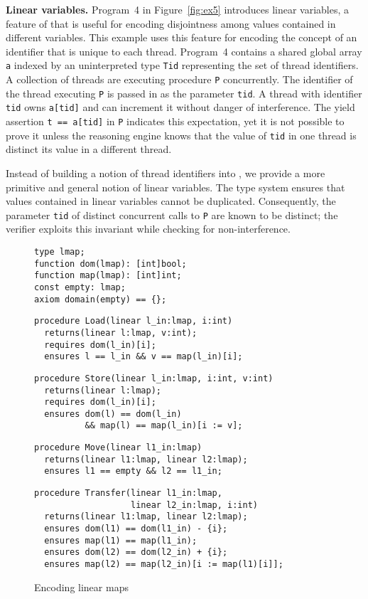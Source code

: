 {\bf Linear variables.}
Program~4 in Figure~\ref{fig:ex5} introduces linear variables, a feature of \civl 
that is useful for encoding disjointness among values contained in 
different variables.  
This example uses this feature for encoding the concept of an identifier 
that is unique to each thread.
Program~4 contains a shared global array {\tt a} indexed by an uninterpreted type {\tt Tid} 
representing the set of thread identifiers.
A collection of threads are executing procedure {\tt P} concurrently.
The identifier of the thread executing {\tt P} is passed in as the parameter {\tt tid}.
A thread with identifier {\tt tid} owns {\tt a[tid]} and can increment it without danger of interference.
The yield assertion {\tt t == a[tid]} in {\tt P} indicates this expectation, yet it is not possible to prove it 
unless the reasoning engine knows that the value of {\tt tid} in one thread is distinct 
its value in a different thread.

Instead of building a notion of thread identifiers into \civl, we provide a more 
primitive and general notion of linear variables.
The \civl type system ensures that values contained in linear variables cannot be duplicated.
Consequently, the parameter {\tt tid} of distinct concurrent calls to {\tt P} are known to be distinct;
the \civl verifier exploits this invariant while checking for non-interference.

\begin{figure}
\begin{verbatim}
type lmap;
function dom(lmap): [int]bool;
function map(lmap): [int]int;
const empty: lmap;
axiom domain(empty) == {};
\end{verbatim}
\begin{verbatim}
procedure Load(linear l_in:lmap, i:int) 
  returns(linear l:lmap, v:int);
  requires dom(l_in)[i];
  ensures l == l_in && v == map(l_in)[i];
\end{verbatim}
\begin{verbatim}
procedure Store(linear l_in:lmap, i:int, v:int) 
  returns(linear l:lmap);
  requires dom(l_in)[i];
  ensures dom(l) == dom(l_in) 
          && map(l) == map(l_in)[i := v];
\end{verbatim}
\begin{verbatim}
procedure Move(linear l1_in:lmap) 
  returns(linear l1:lmap, linear l2:lmap);
  ensures l1 == empty && l2 == l1_in;
\end{verbatim}
\begin{verbatim}
procedure Transfer(linear l1_in:lmap, 
                   linear l2_in:lmap, i:int) 
  returns(linear l1:lmap, linear l2:lmap);
  ensures dom(l1) == dom(l1_in) - {i};
  ensures map(l1) == map(l1_in);
  ensures dom(l2) == dom(l2_in) + {i};
  ensures map(l2) == map(l2_in)[i := map(l1)[i]];
\end{verbatim}
\caption{Encoding linear maps}
\label{fig:linear-maps}
\end{figure}

